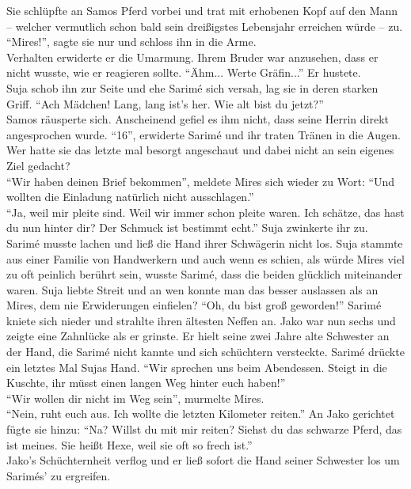 Sie schlüpfte an Samos Pferd vorbei und trat mit erhobenen Kopf auf den Mann – welcher vermutlich 
schon bald sein dreißigstes Lebensjahr erreichen würde – zu. ``Mires!'', sagte sie nur und schloss 
ihn in die Arme. \\
Verhalten erwiderte er die Umarmung. Ihrem Bruder war anzusehen, dass er nicht wusste, wie er 
reagieren sollte. ``Ähm... Werte Gräfin...'' Er hustete.\\
Suja schob ihn zur Seite und ehe Sarimé sich versah, lag sie in deren starken Griff. 
``Ach Mädchen! Lang, lang ist's her. Wie alt bist du jetzt?''\\
Samos räusperte sich. Anscheinend gefiel es ihm nicht, dass seine Herrin direkt angesprochen wurde.
``16'', erwiderte Sarimé und ihr traten Tränen in die Augen. Wer hatte sie das letzte mal besorgt 
angeschaut und dabei nicht an sein eigenes Ziel gedacht? \\
``Wir haben deinen Brief bekommen'', meldete Mires sich wieder zu Wort: ``Und wollten die Einladung 
natürlich nicht ausschlagen.''\\
``Ja, weil mir pleite sind. Weil wir immer schon pleite waren. Ich schätze, das hast du nun hinter 
dir? Der Schmuck ist bestimmt echt.'' Suja zwinkerte ihr zu. \\
Sarimé musste lachen und ließ die Hand ihrer Schwägerin nicht los. Suja stammte aus einer Familie 
von Handwerkern und auch wenn es schien, als würde Mires viel zu oft peinlich berührt sein, wusste 
Sarimé, dass die beiden glücklich miteinander waren. Suja liebte Streit und an wen konnte man das 
besser auslassen als an Mires, dem nie Erwiderungen einfielen?
``Oh, du bist groß geworden!'' Sarimé kniete sich nieder und strahlte ihren ältesten Neffen an. 
Jako 
war nun sechs und zeigte eine Zahnlücke als er grinste. Er hielt seine zwei Jahre alte Schwester an 
der Hand, die Sarimé nicht kannte und sich schüchtern versteckte. Sarimé drückte ein letztes Mal 
Sujas Hand. ``Wir sprechen uns beim Abendessen. Steigt in die Kuschte, ihr müsst einen langen Weg 
hinter euch haben!''\\
``Wir wollen dir nicht im Weg sein'', murmelte Mires.\\
``Nein, ruht euch aus. Ich wollte die letzten Kilometer reiten.'' An Jako gerichtet fügte sie 
hinzu: 
``Na? Willst du mit mir reiten? Siehst du das schwarze Pferd, das ist meines. Sie heißt Hexe, weil 
sie oft so frech ist.''\\
Jako's Schüchternheit verflog und er ließ sofort die Hand seiner Schwester los um Sarimés' zu 
ergreifen. \\


